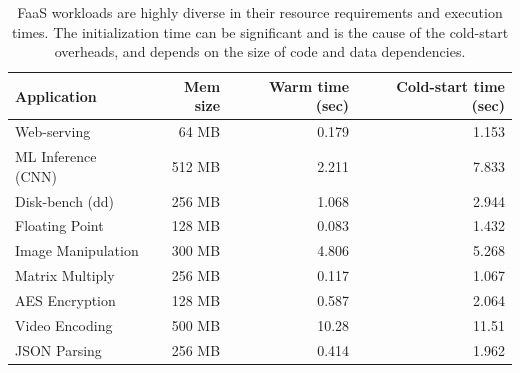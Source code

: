 \begin{table}
  \centering
  \caption{FaaS workloads are highly diverse in their resource requirements and execution times. The initialization time can be significant and is the cause of the cold-start overheads, and depends on the size of code and data dependencies.}
  \begin{tabular}{lrrr}
    \hline 
    Application & Mem size & Warm time (sec) & Cold-start time (sec) \\
    \hline
    Web-serving & 64 MB & 0.179 & 1.153 \\  
    ML Inference (CNN) & 512 MB & 2.211 & 7.833 \\
    Disk-bench (dd) & 256 MB & 1.068 & 2.944 \\  
    Floating Point & 128 MB & 0.083 & 1.432 \\  
    Image Manipulation & 300 MB & 4.806 & 5.268 \\  
    Matrix Multiply & 256 MB & 0.117 & 1.067 \\  
    AES Encryption & 128 MB & 0.587 & 2.064 \\  
    Video Encoding & 500 MB & 10.28 & 11.51 \\  
    JSON Parsing & 256 MB & 0.414 & 1.962 \\
    \hline
  \end{tabular}
  \label{tab:workloads}
\end{table}


